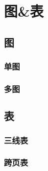 \section{图\&表}

\subsection{图}

\lipsum[1-4]

\subsubsection{单图}
\subsubsection{多图}

\subsection{表}
\subsubsection{三线表}
\subsubsection{跨页表}